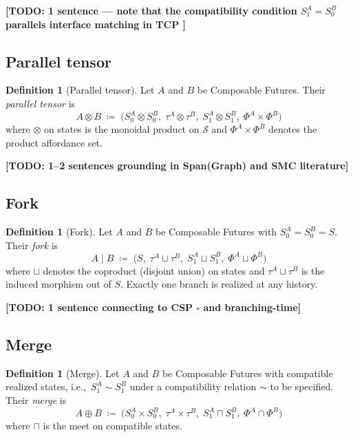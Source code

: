 \documentclass[11pt, a4paper]{article}
\theoremstyle{plain}
\theoremstyle{definition}
\newtheorem{definition}[theorem]{Definition}
\theoremstyle{remark}
\newcommand{\tensor}{\otimes}                  %
\newcommand{\pfork}{\mathbin{|}}               %
\newcommand{\merge}{\oplus}                    %
\newcommand{\States}{\mathcal{S}}              %
\newcommand{\Szero}{S_0}                       %
\newcommand{\Sone}{S_1}                        %
\newcommand{\traj}{\tau}                       %
\newcommand{\aff}{\Phi}                        %
\newcommand{\ie}{i.e.,\xspace}
\begin{document}
\textbf{[TODO: 1 sentence — note that the compatibility condition
$\Sone^A = \Szero^B$ parallels interface matching in TCP
\parencite{katis2009process}]}

\subsection{Parallel tensor}

\begin{definition}[Parallel tensor]
\label{def:tensor}
Let $A$ and $B$ be Composable Futures.
Their \emph{parallel tensor} is
\[
  A \tensor B \;\coloneqq\;
  \bigl(\Szero^A \otimes \Szero^B,\;
        \traj^A \otimes \traj^B,\;
        \Sone^A \otimes \Sone^B,\;
        \aff^A \times \aff^B\bigr)
\]
where $\otimes$ on states is the monoidal product on $\States$ and
$\aff^A \times \aff^B$ denotes the product affordance set.
\end{definition}


\textbf{[TODO: 1--2 sentences grounding in Span(Graph) and SMC literature]}

\subsection{Fork}

\begin{definition}[Fork]
\label{def:fork}
Let $A$ and $B$ be Composable Futures with $\Szero^A = \Szero^B = S$.
Their \emph{fork} is
\[
  A \pfork B \;\coloneqq\;
  \bigl(S,\; \traj^A \sqcup \traj^B,\; \Sone^A \sqcup \Sone^B,\;
        \aff^A \sqcup \aff^B\bigr)
\]
where $\sqcup$ denotes the coproduct (disjoint union) on states and
$\traj^A \sqcup \traj^B$ is the induced morphism out of $S$.
Exactly one branch is realized at any history.
\end{definition}


\textbf{[TODO: 1 sentence connecting to CSP $\square$ and branching-time]}

\subsection{Merge}

\begin{definition}[Merge]
\label{def:merge}
Let $A$ and $B$ be Composable Futures with compatible realized states,
\ie\ $\Sone^A \sim \Sone^B$ under a compatibility relation $\sim$ to be
specified.
Their \emph{merge} is
\[
  A \merge B \;\coloneqq\;
  \bigl(\Szero^A \times \Szero^B,\;
        \traj^A \times \traj^B,\;
        \Sone^A \sqcap \Sone^B,\;
        \aff^A \cap \aff^B\bigr)
\]
where $\sqcap$ is the meet on compatible states.
\end{definition}
\end{document}

